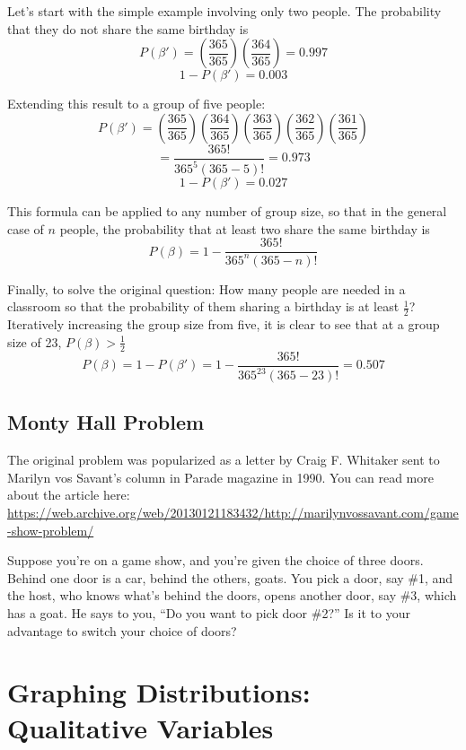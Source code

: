 \documentclass[
]{book}
\begin{document}
Let's start with the simple example involving only two people. The probability that they do not share the same birthday is
\[P(\beta') = \left( \frac{365}{365} \right) \left( \frac{364}{365} \right) = 0.997\]
\[1 - P(\beta') = 0.003\]

Extending this result to a group of five people:
\[P(\beta') = \left( \frac{365}{365} \right) \left( \frac{364}{365} \right) \left( \frac{363}{365} \right) 
\left( \frac{362}{365} \right) \left( \frac{361}{365} \right)\]
\[ = \frac{365!}{365^5(365 - 5)!} = 0.973\]
\[1 - P(\beta') = 0.027\]

This formula can be applied to any number of group size, so that in the general case of \(n\) people,
the probability that at least two share the same birthday is
\[P(\beta) = 1 - \frac{365!}{365^n(365 - n)!}\]

Finally, to solve the original question:
How many people are needed in a classroom so that the probability of them sharing a birthday is at least \(\frac{1}{2}\)?
Iteratively increasing the group size from five, it is clear to see that at a group size of 23, \(P(\beta) > \frac{1}{2}\)
\[P(\beta) = 1 - P(\beta') = 1 - \frac{365!}{365^{23}(365 - 23)!} = 0.507\]

\hypertarget{monty-hall-problem}{%
\section{Monty Hall Problem}\label{monty-hall-problem}}

The original problem was popularized as a letter by Craig F. Whitaker sent to Marilyn vos Savant's column in Parade magazine in 1990.
You can read more about the article here: \url{https://web.archive.org/web/20130121183432/http://marilynvossavant.com/game-show-problem/}

Suppose you're on a game show, and you're given the choice of three doors. Behind one door is a car, behind the others, goats.
You pick a door, say \#1, and the host, who knows what's behind the doors, opens another door, say \#3, which has a goat.
He says to you, ``Do you want to pick door \#2?'' Is it to your advantage to switch your choice of doors?

\hypertarget{graphing-distributions-qualitative-variables}{%
\chapter{Graphing Distributions: Qualitative Variables}\label{graphing-distributions-qualitative-variables}}
\end{document}
